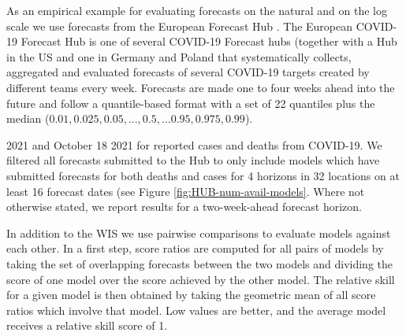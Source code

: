 \documentclass{article}
\begin{document}
As an empirical example for evaluating forecasts on the natural and on the log scale we use forecasts from the European Forecast Hub \citep{europeancovid-19forecasthubEuropeanCovid19Forecast2021, sherrattPredictivePerformanceMultimodel2022}. 
The European COVID-19 Forecast Hub is one of several COVID-19 Forecast hubs (together with a Hub in the US \citep{cramerEvaluationIndividualEnsemble2021} and one in Germany and Poland \citep{bracherShorttermForecastingCOVID192021} that systematically collects, aggregated and evaluated forecasts of several COVID-19 targets created by different teams every week. Forecasts are made one to four weeks ahead into the future and follow a quantile-based format with a set of 22 quantiles plus the median ($0.01, 0.025, 0.05, ..., 0.5, ... 0.95, 0.975, 0.99$). 

 2021 and October 18 2021 for reported cases and deaths from COVID-19. We filtered all forecasts submitted to the Hub to only include models which have submitted forecasts for both deaths and cases for 4 horizons in 32 locations on at least 16 forecast dates (see Figure \ref{fig:HUB-num-avail-models}. Where not otherwise stated, we report results for a two-week-ahead forecast horizon. 

In addition to the WIS we use pairwise comparisons \citep{cramerEvaluationIndividualEnsemble2021} to evaluate models against each other. In a first step, score ratios are computed for all pairs of models by taking the set of overlapping forecasts between the two models and dividing the score of one model over the score achieved by the other model. The relative skill for a given model is then obtained by taking the geometric mean of all score ratios which involve that model. Low values are better, and the average model receives a relative skill score of 1. 

% 
\end{document}
